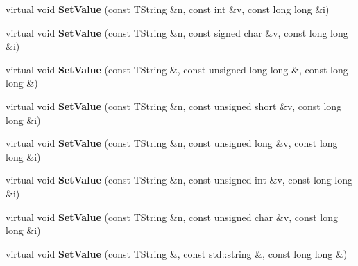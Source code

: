 \begin{DoxyCompactItemize}
\item 
\hypertarget{class_h_a_l_1_1_analysis_data_aaddff4f1a41b2311b5f59a4eb4eb7a41}{virtual void {\bfseries Set\+Value} (const T\+String \&n, const int \&v, const long long \&i)}\label{class_h_a_l_1_1_analysis_data_aaddff4f1a41b2311b5f59a4eb4eb7a41}

\item 
\hypertarget{class_h_a_l_1_1_analysis_data_acea99cc8c68cf2a9d5f82da7e0d33202}{virtual void {\bfseries Set\+Value} (const T\+String \&n, const signed char \&v, const long long \&i)}\label{class_h_a_l_1_1_analysis_data_acea99cc8c68cf2a9d5f82da7e0d33202}

\item 
\hypertarget{class_h_a_l_1_1_analysis_data_a20938ad3fcd255b41f894e44b3e363f8}{virtual void {\bfseries Set\+Value} (const T\+String \&, const unsigned long long \&, const long long \&)}\label{class_h_a_l_1_1_analysis_data_a20938ad3fcd255b41f894e44b3e363f8}

\item 
\hypertarget{class_h_a_l_1_1_analysis_data_a8d61e54fe6022a58837468e1059a7e80}{virtual void {\bfseries Set\+Value} (const T\+String \&n, const unsigned short \&v, const long long \&i)}\label{class_h_a_l_1_1_analysis_data_a8d61e54fe6022a58837468e1059a7e80}

\item 
\hypertarget{class_h_a_l_1_1_analysis_data_a2af1428a8feebf6769cb30dd656d4b1e}{virtual void {\bfseries Set\+Value} (const T\+String \&n, const unsigned long \&v, const long long \&i)}\label{class_h_a_l_1_1_analysis_data_a2af1428a8feebf6769cb30dd656d4b1e}

\item 
\hypertarget{class_h_a_l_1_1_analysis_data_a446ed8d103e405b5028a9cebeae11bdf}{virtual void {\bfseries Set\+Value} (const T\+String \&n, const unsigned int \&v, const long long \&i)}\label{class_h_a_l_1_1_analysis_data_a446ed8d103e405b5028a9cebeae11bdf}

\item 
\hypertarget{class_h_a_l_1_1_analysis_data_af11d8522043ee9ddebea6beddfafdb1f}{virtual void {\bfseries Set\+Value} (const T\+String \&n, const unsigned char \&v, const long long \&i)}\label{class_h_a_l_1_1_analysis_data_af11d8522043ee9ddebea6beddfafdb1f}

\item 
\hypertarget{class_h_a_l_1_1_analysis_data_a2c1fe18ae83a39d8278630896e3b20cf}{virtual void {\bfseries Set\+Value} (const T\+String \&, const std\+::string \&, const long long \&)}\label{class_h_a_l_1_1_analysis_data_a2c1fe18ae83a39d8278630896e3b20cf}


\end{DoxyCompactItemize}
